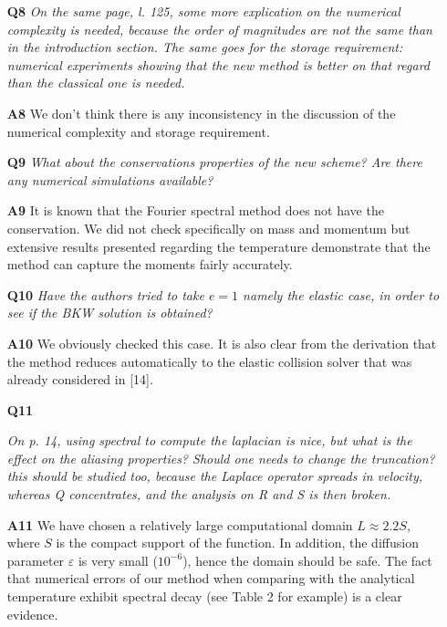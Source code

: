 \documentclass[11pt]{article}
\begin{document}
\begin{itemize}
\item[{\bf Q8}] {\it On the same page, l. 125, some more explication on the numerical complexity is needed, because the order of magnitudes are not the same than in the introduction section. The same goes for the storage requirement: numerical experiments showing that the new method is better on that regard than the classical one is needed.
}

\item[{\bf A8}] We don't think there is any inconsistency in the discussion of the numerical complexity and storage requirement.

\item[{\bf Q9}] {\it What about the conservations properties of the new scheme? Are there any numerical simulations available?
}

\item[{\bf A9}] It is known that the Fourier spectral method does not have the conservation. We did not check specifically on mass and momentum but extensive results presented regarding the temperature demonstrate that the method can capture the moments fairly accurately. 

\item[{\bf Q10}] {\it Have the authors tried to take $e=1$ namely the elastic case, in order to see if the BKW solution is obtained?
}

\item[{\bf A10}] We obviously checked this case. It is also clear from the derivation that the method reduces automatically to the elastic collision solver that was already considered in [14].

\item[{\bf Q11}] {\it On p. 14, using spectral to compute the laplacian is nice, but what is the effect on the aliasing properties? Should one needs to change the truncation? this should be studied too, because the Laplace operator spreads in velocity, whereas Q concentrates, and the analysis on R and S is then broken.

}

\item[{\bf A11}] We have chosen a relatively large computational domain $L\approx 2.2 S$, where $S$ is the compact support of the function. In addition, the diffusion parameter $\varepsilon$ is very small ($10^{-6}$), hence the domain should be safe. The fact that numerical errors of our method when comparing with the analytical temperature exhibit spectral decay (see Table 2 for example) is a clear evidence.


\end{itemize}
\end{document}
